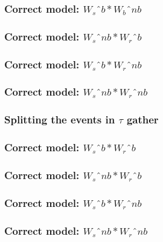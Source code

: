 \begin{frame} \frametitle{Correct model: $W_{s}ˆ{b} * W_{b}ˆ{nb} $}
\end{frame}

\begin{frame} \frametitle{Correct model: $W_{s}ˆ{nb} * W_{r}ˆ{b} $}
\end{frame}

\begin{frame} \frametitle{Correct model: $W_{s}ˆ{b} * W_{r}ˆ{nb} $}
\end{frame}

\begin{frame} \frametitle{Correct model: $W_{s}ˆ{nb} * W_{r}ˆ{nb} $}
\end{frame}







\begin{frame} \frametitle{Splitting the events in $\tau$ gather} \end{frame}

\begin{frame} \frametitle{Correct model: $W_{s}ˆb * W_{r}ˆb $}
\end{frame}

\begin{frame} \frametitle{Correct model: $W_{s}ˆ{nb} * W_{r}ˆ{b} $}
\end{frame}


\begin{frame} \frametitle{Correct model: $W_{s}ˆ{b} * W_{r}ˆ{nb} $}
\end{frame}

\begin{frame} \frametitle{Correct model: $W_{s}ˆ{nb} * W_{r}ˆ{nb} $}
\end{frame}








